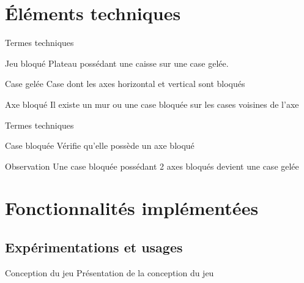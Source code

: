 \documentclass{beamer}
\begin{document}
\section{Éléments techniques}
\begin{frame}{Termes techniques}
  \vfill
  \begin{block}{Jeu bloqué}
    Plateau possédant une caisse sur une case gelée.
  \end{block}
  \vfill
  \begin{block}{Case gelée}
    Case dont les axes horizontal et vertical sont bloqués
  \end{block}
  \vfill
  \begin{block}{Axe bloqué}
    Il existe un mur ou une case bloquée sur les cases voisines de l'axe
  \end{block}
\end{frame}

\begin{frame}{Termes techniques}
  \vfill
  \begin{block}{Case bloquée}
    Vérifie qu'elle possède un axe bloqué 
  \end{block}
  \vfill
  \begin{alertblock}{Observation}
    Une case bloquée possédant 2 axes bloqués devient une case gelée
  \end{alertblock}
\end{frame}


\section{Fonctionnalités implémentées}
\subsection{Expérimentations et usages}\label{exp-and-usages}

\begin{frame}{}
  \begin{block}{Conception du jeu}
    Présentation de la conception du jeu
  \end{block}
\end{frame}
\end{document}
